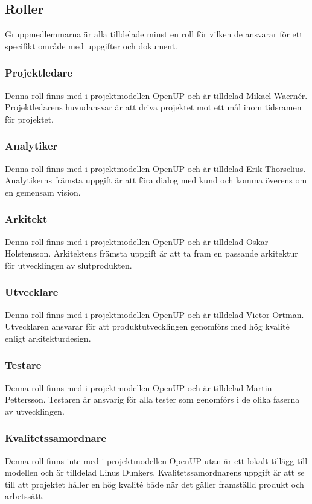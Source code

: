 \subsection{Roller}
Gruppmedlemmarna är alla tilldelade minst en roll för vilken de ansvarar för ett specifikt område med uppgifter och dokument.

\subsubsection{Projektledare}
Denna roll finns med i projektmodellen OpenUP och är tilldelad Mikael Waernér. Projektledarens huvudansvar är att driva projektet mot ett mål inom tidsramen för projektet.

\subsubsection{Analytiker}
Denna roll finns med i projektmodellen OpenUP och är tilldelad Erik Thorselius. Analytikerns främsta uppgift är att föra dialog med kund och komma överens om en gemensam vision.

\subsubsection{Arkitekt}
Denna roll finns med i projektmodellen OpenUP och är tilldelad Oskar Holstensson. Arkitektens främsta uppgift är att ta fram en passande arkitektur för utvecklingen av slutprodukten.

\subsubsection{Utvecklare}
Denna roll finns med i projektmodellen OpenUP och är tilldelad Victor Ortman. Utvecklaren ansvarar för att produktutvecklingen genomförs med hög kvalité enligt arkitekturdesign.

\subsubsection{Testare}
Denna roll finns med i projektmodellen OpenUP och är tilldelad Martin Pettersson. Testaren är ansvarig för alla tester som genomförs i de olika faserna av utvecklingen.

\subsubsection{Kvalitetssamordnare}
Denna roll finns inte med i projektmodellen OpenUP utan är ett lokalt tillägg till modellen och är tilldelad Linus Dunkers. Kvalitetssamordnarens uppgift är att se till att projektet håller en hög kvalité både när det gäller framställd produkt och arbetssätt.

